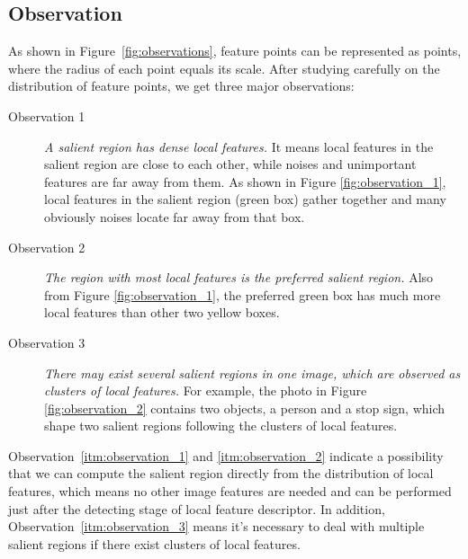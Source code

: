 \subsection{Observation}

As shown in Figure~\ref{fig:observations}, feature points can be represented as points, where the radius of each point equals its scale. After studying carefully on the distribution of feature points, we get three major observations:

\begin{description}
	
	\item[Observation 1]  \textit{A salient region has dense local features.} It means local features in the salient region are close to each other, while noises and unimportant features are far away from them. As shown in Figure \ref{fig:observation_1}, local features in the salient region (green box) gather together and many obviously noises locate far away from that box. 

	\item[Observation 2]  \textit{The region with most local features is the preferred salient region.} Also from Figure \ref{fig:observation_1}, the preferred green box has much more local features than other two yellow boxes. 

	\item[Observation 3]  \textit{There may exist several salient regions in one image, which are observed as clusters of local features.} For example, the photo in Figure \ref{fig:observation_2} contains two objects, a person and a stop sign, which shape two salient regions following the clusters of local features.

\end{description}

Observation~\ref{itm:observation_1} and \ref{itm:observation_2} indicate a possibility that we can compute the salient region directly from the distribution of local features, which means no other image features are needed and can be performed just after the detecting stage of local feature descriptor. In addition, Observation~\ref{itm:observation_3} means it's necessary to deal with multiple salient regions if there exist clusters of local features.